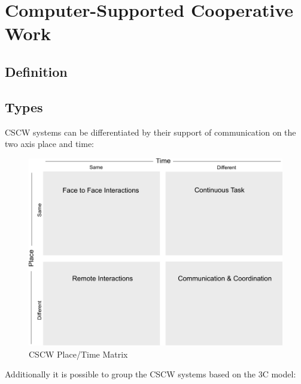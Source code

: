 
\section{Computer-Supported Cooperative Work}
\label{sec:cscw}

\subsection{Definition}
\label{sec:cscw_definition}


\subsection{Types}
\label{sec:cscw_types}

CSCW systems can be differentiated by their support of communication on the two axis
place and time: \\

\begin{figure}[H]
 \centering
 \includegraphics[width=0.8\columnwidth]{images/cscw_time_place_matrix.pdf}
 \caption{CSCW Place/Time Matrix \citep{xx}}
\label{fig:images_cscw_time_place_matrix}
\end{figure}

Additionally it is possible to group the CSCW systems based on the 3C model: \\

